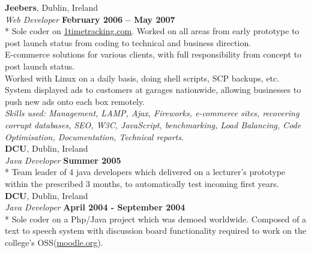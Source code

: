 \documentclass[margin,line]{resume}
\begin{document}
\begin{resume}
    \textbf{Jeebers}, Dublin, Ireland \vspace{2mm}\\\vspace{1mm}%
    \textsl{Web Developer} \hfill \textbf{February 2006 -- May 2007}\\*
    Sole coder on \href{http://1timetracking.com}{1timetracking.com}. Worked on all areas from early prototype to post launch status from coding to technical and business direction. \\%
    E-commerce solutions for various clients, with full responsibility from concept to post launch status. \vspace{1mm}\\%
    Worked with Linux on a daily basis, doing shell scripts, SCP backups, etc. System displayed ads to customers at garages nationwide, allowing businesses to push new ads onto each box remotely.\vspace{1mm}\\%
    \textsl{Skills used: Management, LAMP, Ajax, Fireworks, e-commerce sites, recovering corrupt databases, SEO, W3C, JavaScript, benchmarking, Load Balancing, Code Optimisation, Documentation, Technical reports.}\vspace{1mm}\\%


    \textbf{DCU}, Dublin, Ireland \vspace{2mm}\\\vspace{1mm}%
    \textsl{Java Developer} \hfill \textbf{Summer 2005}\\*
    Team leader of 4 java developers which delivered on a lecturer's prototype within the prescribed 3 months, to automatically test incoming first years. \vspace{1mm}\\%
  
    \textbf{DCU}, Dublin, Ireland \vspace{2mm}\\\vspace{1mm}%
    \textsl{Java Developer} \hfill \textbf{April 2004 - September 2004}\\*
    Sole coder on a Php/Java project which was demoed worldwide. Composed of a text to speech system with discussion board functionality required to work on the college's OSS(\href{http://moodle.org}{moodle.org}).


\end{resume}
\end{document}
